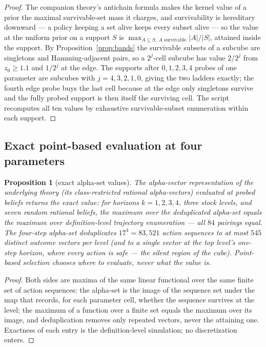 \documentclass[10pt,twocolumn]{article}
\theoremstyle{plain}
\newtheorem{proposition}[theorem]{Proposition}
\theoremstyle{definition}
\theoremstyle{remark}
\begin{document}
\begin{proof}
The companion theory's antichain formula makes the kernel value of a
prior the maximal survivable-set mass it charges, and survivability is
hereditary downward --- a policy keeping a set alive keeps every
subset alive --- so the value at the uniform prior on a support
\(S\) is \(\max_{A \subseteq S,\ A
\text{ survivable}} |A|/|S|\), attained inside the support. By
Proposition~\ref{prop:bands} the survivable subsets of a subcube are
singletons and Hamming-adjacent pairs, so a \(2^{j}\)-cell subcube
has value \(2/2^{j}\) from \(z_{0} \ge 1.1\) and \(1/2^{j}\) at
the edge. The supports after \(0, 1, 2, 3, 4\) probes of one
parameter are subcubes with \(j = 4, 3, 2, 1, 0\), giving the two
ladders exactly; the fourth edge probe buys the last cell because at
the edge only singletons survive and the fully probed support is then
itself the surviving cell. The script recomputes all ten values by
exhaustive survivable-subset enumeration within each support.
\end{proof}

\subsection{Exact point-based evaluation at four parameters}
\label{pbvi}

\begin{proposition}[exact alpha-set values]\label{prop:pbvi}
The alpha-vector representation of the underlying theory (its
class-restricted rational alpha-vectors) evaluated at probed beliefs
returns the exact value: for horizons \(k = 1, 2, 3, 4\), three stock
levels, and seven random rational beliefs, the maximum over the
deduplicated alpha-set equals the maximum over definition-level
trajectory enumeration --- all \(84\) pairings equal. The four-step
alpha-set deduplicates \(17^{4} = 83{,}521\) action sequences to at
most \(545\) distinct outcome vectors per level (and to a single
vector at the top level's one-step horizon, where every action is
safe --- the silent region of the cube). Point-based selection
chooses where to evaluate, never what the value is.
\end{proposition}

\begin{proof}
Both sides are maxima of the same linear functional over the same
finite set of action sequences: the alpha-set is the image of the
sequence set under the map that records, for each parameter cell,
whether the sequence survives at the level; the maximum of a function
over a finite set equals the maximum over its image, and
deduplication removes only repeated vectors, never the attaining one.
Exactness of each entry is the definition-level simulation; no
discretization enters.
\end{proof}
\end{document}
